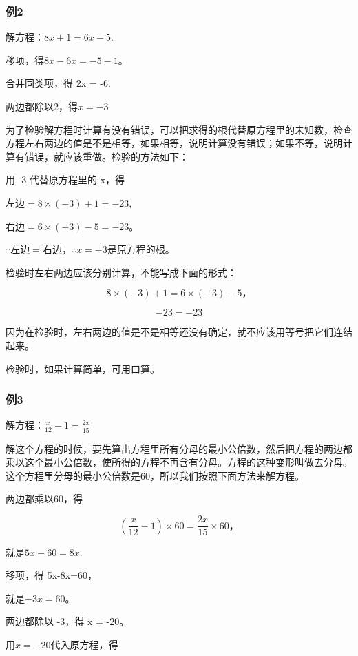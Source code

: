 \subsubsection{例2}

解方程：\(8x + 1 = 6x - 5.\)

 移项，得\(8x - 6x = -5 - 1\)。

合并同类项，得 2x = -6.

两边都除以2，得\(x = -3\)

为了检验解方程时计算有没有错误，可以把求得的根代替原方程里的未知数，检查方程左右两边的值是不是相等，如果相等，说明计算没有错误；如果不等，说明计算有错误，就应该重做。检验的方法如下：

 用 -3 代替原方程里的 x，得

左边\(= 8 \times (-3) + 1 = -23,\)

右边\(= 6 \times (-3) - 5 = -23\)。

\(\because\)左边\(=\)右边，\(\therefore x = -3\)是原方程的根。

 检验时左右两边应该分别计算，不能写成下面的形式：

\[
8 \times (- 3) + 1 = 6 \times (- 3) - 5\text{，}
\]

\[
- 23 = - 23
\]

因为在检验时，左右两边的值是不是相等还没有确定，就不应该用等号把它们连结起来。

检验时，如果计算简单，可用口算。

\subsubsection{例3}

解方程：\(\frac{x}{12} - 1 = \frac{2x}{15}\)

解这个方程的时候，要先算出方程里所有分母的最小公倍数，然后把方程的两边都乘以这个最小公倍数，使所得的方程不再含有分母。方程的这种变形叫做去分母。这个方程里分母的最小公倍数是60，所以我们按照下面方法来解方程。

 两边都乘以60，得

\[
\left(\frac{x}{12} - 1\right) \times 60 = \frac{2 x}{15} \times 60\text{，}
\]

就是\(5x - 60 = 8x.\)

移项，得 5x-8x=60，

就是\(-3x = 60\)。

两边都除以 -3，得 x = -20。

 用\(x = -20\)代入原方程，得

